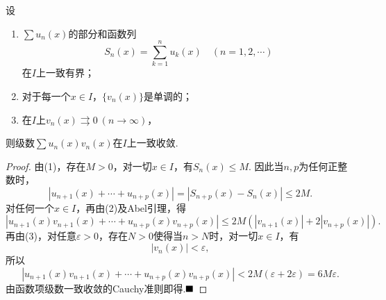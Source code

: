 \begin{theorem}[Dirichlet判别法]
	设
	\begin{enumerate}[(1)]
		\item $\sum u_n(x)$的部分和函数列
		$$S_n(x)=\sum_{k=1}^{n}u_k(x)\quad (n=1,2,\cdots)$$
		在$I$上一致有界；
		\item 对于每一个$x\in I$，$\{v_n(x)\}$是单调的；
		\item 在$I$上$v_n(x)\rightrightarrows 0\ (n\to\infty)$，
	\end{enumerate}
	则级数$\sum u_n(x)v_n(x)$在$I$上一致收敛.
\end{theorem}
\begin{proof}
	由(1)，存在$M>0$，对一切$x\in I$，有$S_n(x)\leqslant M$. 因此当$n,p$为任何正整数时，
	$$|u_{n+1}(x)+\cdots+u_{n+p}(x)|=|S_{n+p}(x)-S_n(x)|\leqslant 2M.$$
	对任何一个$x\in I$，再由(2)及Abel引理，得
	$$|u_{n+1}(x)v_{n+1}(x)+\cdots+u_{n+p}(x)v_{n+p}(x)|\leqslant 2M(|v_{n+1}(x)|+2|v_{n+p}(x)|).$$
	再由(3)，对任意$\varepsilon>0$，存在$N>0$使得当$n>N$时，对一切$x\in I$，有
	$$|v_n(x)|<\varepsilon,$$
	所以
	$$|u_{n+1}(x)v_{n+1}(x)+\cdots+u_{n+p}(x)v_{n+p}(x)|<2M(\varepsilon+2\varepsilon)=6M\varepsilon.$$
	由函数项级数一致收敛的Cauchy准则即得.$\hfill\blacksquare$
\end{proof}
